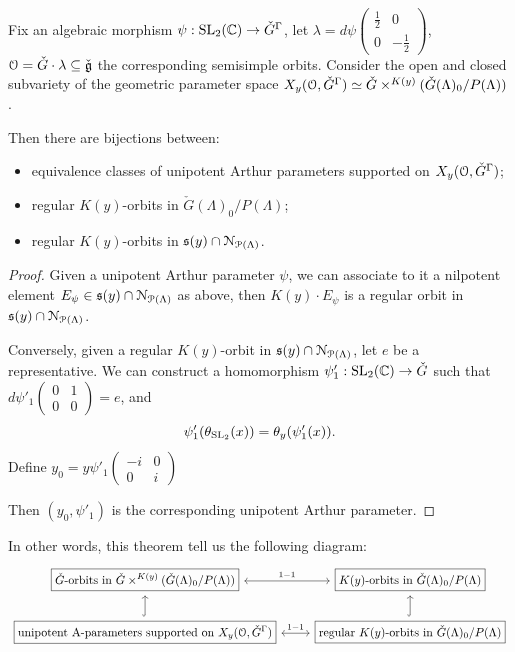 \documentclass[12pt]{amsart}
\numberwithin{equation}{section}
\newcommand{\fg}{\mathfrak{g}} \newcommand{\fh}{\mathfrak{h}} \newcommand{\fk}{\mathfrak{k}}
\begin{document}
\begin{thm}
  Fix an algebraic morphism $\psi : {\mathrm{SL}}_2({\mathbb {C}}) \to \check{G}^{\Gamma}$, let $\lambda = d\psi \begin{pmatrix} \frac{1}{2} & 0 \\ 0 & -\frac{1}{2} \end{pmatrix}$, $\CO = \check{G} \cdot \lambda \subseteq \check{\fg}$ the corresponding semisimple orbits. 
  Consider the open and closed subvariety of the geometric parameter space $X_y({\mathcal {O}},\check{G}^{\Gamma}) \simeq \check{G} \times^{K(y)} (\check{G}(\Lambda)_0/P(\Lambda))$. 
  
  Then there are bijections between:
  \begin{itemize}
    \item equivalence classes of unipotent Arthur parameters supported on $X_y({\mathcal {O}},\check{G}^{\Gamma})$;
    \item regular $K(y)$-orbits in $\check{G}(\Lambda)_0/P(\Lambda)$;
    \item regular $K(y)$-orbits in $\mathfrak{s}(y) \cap \mathcal{N}_{{\mathcal {P}}(\Lambda)}$.
  \end{itemize}

\end{thm}

\begin{proof}
  Given a unipotent Arthur parameter $\psi$, we can associate to it a nilpotent element $E_{\psi} \in \mathfrak{s}(y) \cap \mathcal{N}_{{\mathcal {P}}(\Lambda)}$ as above, then $K(y) \cdot E_\psi$ is a regular orbit in $\mathfrak{s}(y) \cap \mathcal{N}_{{\mathcal {P}}(\Lambda)}$.

  Conversely, given a regular $K(y)$-orbit in $\mathfrak{s}(y) \cap \mathcal{N}_{{\mathcal {P}}(\Lambda)}$, let $e$ be a representative. We can construct a homomorphism $\psi'_1 : {\mathrm{SL}}_2({\mathbb {C}}) \to \check{G}$ such that $d\psi'_1 \begin{pmatrix} 0 & 1 \\ 0 & 0 \end{pmatrix} = e$, and \[\psi'_1(\theta_{{\mathrm{SL}}_2}(x)) = \theta_y(\psi'_1(x)).\]
  Define $y_0 = y \psi'_1\begin{pmatrix}
  -i & 0 \\ 0 & i
  \end{pmatrix}$

  Then $(y_0,\psi'_1)$ is the corresponding unipotent Arthur parameter.
\end{proof}

\begin{rk}
  In other words, this theorem tell us the following diagram:
  \[
  \begin{tikzcd}
    \boxed{\text{$\check{G}$-orbits in $\check{G} \times^{K(y)} (\check{G}(\Lambda)_0/P(\Lambda))$}} \arrow[r,leftrightarrow,"1-1"] & \boxed{\text{$K(y)$-orbits in $\check{G}(\Lambda)_0/P(\Lambda)$}}  \\
    \boxed{\text{unipotent A-parameters supported on $X_y(\CO,\check{G}^{\Gamma})$}} \arrow[u,hookrightarrow] \arrow[r,leftrightarrow,"1-1"] & \boxed{\text{regular $K(y)$-orbits in $\check{G}(\Lambda)_0/P(\Lambda)$}} \arrow[u,hookrightarrow]
  \end{tikzcd}
  \]
\end{rk}
\end{document}

